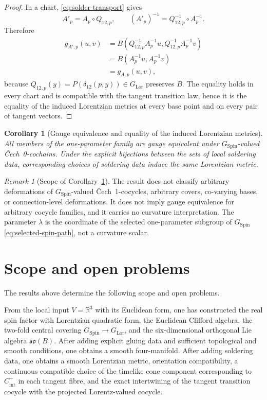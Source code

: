 \documentclass[11pt,a4paper]{article}
\newtheorem{corollary}[theorem]{Corollary}
\theoremstyle{definition}
\theoremstyle{remark}
\newtheorem{remark}[theorem]{Remark}
\newcommand{\R}{\mathbb{R}}
\newcommand{\SpinG}{G_{\mathrm{Spin}}}
\newcommand{\LorG}{G_{\mathrm{Lor}}}
\newcommand{\Cech}{\ifmmode\text{\v{C}ech}\else\v{C}ech\fi}
\begin{document}
\begin{proof}
In a chart, \eqref{eq:solder-transport} gives
\[
    A'_p=A_p\circ Q_{12,p},
    \qquad
    (A'_p)^{-1}=Q_{12,p}^{-1}\circ A_p^{-1}.
\]
Therefore
\[
\begin{aligned}
 g_{A',p}(u,v)
 &=B\!\left(Q_{12,p}^{-1}A_p^{-1}u,
            Q_{12,p}^{-1}A_p^{-1}v\right)\\
 &=B\!\left(A_p^{-1}u,A_p^{-1}v\right)\\
 &=g_{A,p}(u,v),
\end{aligned}
\]
because \(Q_{12,p}(y)=P(\delta_{12}(p,y))\in\LorG\) preserves \(B\).
The equality holds in every chart and is compatible with the tangent
transition law, hence it is the equality of the induced Lorentzian metrics at
every base point and on every pair of tangent vectors.
\end{proof}

\begin{corollary}[Gauge equivalence and equality of the induced Lorentzian metrics]
\label{cor:family-gauge-redundancy}
All members of the one-parameter family are gauge equivalent under \(\SpinG\)-valued \Cech\ 0-cochains.  Under the explicit bijections between the sets of local soldering data,
corresponding choices of soldering data induce the same Lorentzian metric.
\end{corollary}

\begin{remark}[Scope of Corollary~\ref{cor:family-gauge-redundancy}]
The result does not classify arbitrary deformations of \(\SpinG\)-valued \Cech\ 1-cocycles, arbitrary
covers, co-varying bases, or connection-level deformations.  It does not
imply gauge equivalence for arbitrary cocycle families, and it carries no
curvature interpretation.  The parameter \(\lambda\) is the coordinate of
the selected one-parameter subgroup of \(\SpinG\) \eqref{eq:selected-spin-path}, not a curvature scalar.
\end{remark}

\clearpage
\section{Scope and open problems}
\label{sec:boundary}

The results above determine the following scope and open problems.

From the local input \(V=\R^{3}\) with its Euclidean form, one has
constructed the real spin factor with Lorentzian quadratic form, the Euclidean Clifford algebra, the two-fold central covering \(\SpinG\to\LorG\), and the six-dimensional orthogonal Lie algebra \(\mathfrak{so}(B)\).
After adding explicit gluing data and sufficient topological and smooth
conditions, one obtains a smooth four-manifold.  After adding soldering data, one obtains a smooth Lorentzian metric, orientation compatibility, a continuous compatible choice of the timelike cone component corresponding to \(C^{+}_{\mathrm{int}}\) in each tangent fibre, and the exact intertwining of the tangent transition cocycle with the projected Lorentz-valued cocycle.
\end{document}
